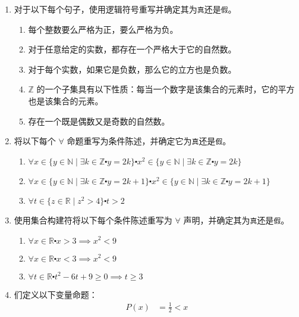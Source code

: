 \begin{enumerate}[label=(\arabic*)]
    \item 对于以下每个句子，使用逻辑符号重写并确定其为\verb|真|还是\verb|假|。
        \begin{enumerate}[label=(\alph*)]
            \item 每个整数要么严格为正，要么严格为负。
            \item 对于任意给定的实数，都存在一个严格大于它的自然数。
            \item 对于每个实数，如果它是负数，那么它的立方也是负数。
            \item $\mathbb{Z}$ 的一个子集具有以下性质：每当一个数字是该集合的元素时，它的平方也是该集合的元素。
            \item 存在一个既是偶数又是奇数的自然数。
        \end{enumerate}
    \item 将以下每个 $\forall$ 命题重写为条件陈述，并确定它为\verb|真|还是\verb|假|。
        \begin{enumerate}[label=(\alph*)]
            \item $\forall x \in \{y \in \mathbb{N} \mid \exists k \in \mathbb{Z} \centerdot y = 2k\} \centerdot x^2 \in \{y \in \mathbb{N} \mid \exists k \in \mathbb{Z} \centerdot y = 2k\}$
            \item $\forall x \in \{y \in \mathbb{N} \mid \exists k \in \mathbb{Z} \centerdot y = 2k + 1\} \centerdot x^2 \in \{y \in \mathbb{N} \mid \exists k \in \mathbb{Z} \centerdot y = 2k + 1\}$
            \item $\forall t \in \{z \in \mathbb{R} \mid z^2 > 4\} \centerdot t > 2$
        \end{enumerate}
    \item 使用集合构建符将以下每个条件陈述重写为 $\forall$ 声明，并确定其为\verb|真|还是\verb|假|。
        \begin{enumerate}[label=(\alph*)]
            \item $\forall x \in \mathbb{R} \centerdot x > 3 \implies x^2 < 9$
            \item $\forall x \in \mathbb{R} \centerdot x < 3 \implies x^2 < 9$
            \item $\forall t \in \mathbb{R} \centerdot t^2 - 6t + 9 \ge 0 \implies t \ge 3$
        \end{enumerate}
    \item 们定义以下变量命题：
        \begin{align*}
            P(x) &= \frac{1}{2} < x \\

\end{align*}
\end{enumerate}
